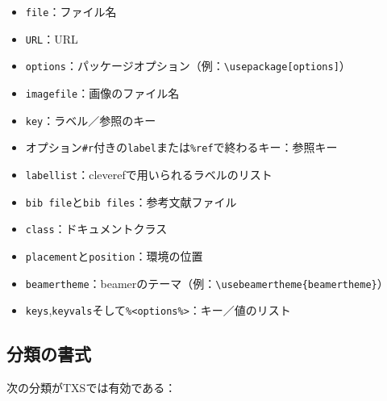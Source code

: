 \begin{itemize}
\item
  \verb+file+：ファイル名
\item
  \verb+URL+：URL
\item
  \verb+options+：パッケージオプション（例：\verb+\usepackage[options]+）
\item
  \verb+imagefile+：画像のファイル名
\item
  \verb+key+：ラベル／参照のキー
\item
  オプション\verb+#r+付きの\verb+label+または\verb+%ref+で終わるキー：参照キー
\item
  \verb+labellist+：cleverefで用いられるラベルのリスト
\item
  \verb+bib file+と\verb+bib files+：参考文献ファイル
\item
  \verb+class+：ドキュメントクラス
\item
  \verb+placement+と\verb+position+：環境の位置
\item
  \verb+beamertheme+：beamerのテーマ（例：\verb+\usebeamertheme{beamertheme}+）
\item
  \verb+keys+,\verb+keyvals+そして\verb+%<options%>+：キー／値のリスト
\end{itemize}

\subsection{分類の書式}

次の分類がTXSでは有効である：

